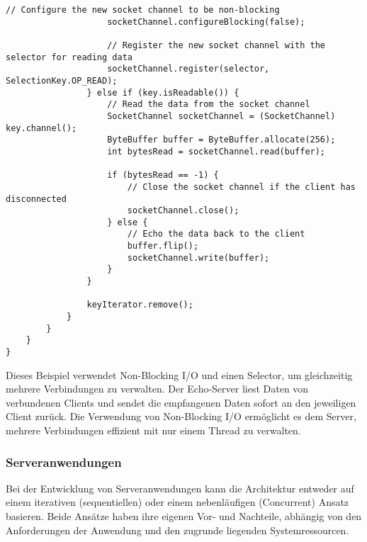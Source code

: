 \begin{lstlisting}[caption={Non-Blocking},captionpos=b,label={lst:nonb}]
                    // Configure the new socket channel to be non-blocking
                    socketChannel.configureBlocking(false);

                    // Register the new socket channel with the selector for reading data
                    socketChannel.register(selector, SelectionKey.OP_READ);
                } else if (key.isReadable()) {
                    // Read the data from the socket channel
                    SocketChannel socketChannel = (SocketChannel) key.channel();
                    ByteBuffer buffer = ByteBuffer.allocate(256);
                    int bytesRead = socketChannel.read(buffer);

                    if (bytesRead == -1) {
                        // Close the socket channel if the client has disconnected
                        socketChannel.close();
                    } else {
                        // Echo the data back to the client
                        buffer.flip();
                        socketChannel.write(buffer);
                    }
                }

                keyIterator.remove();
            }
        }
    }
}
\end{lstlisting}
Dieses Beispiel verwendet Non-Blocking I/O und einen Selector, um gleichzeitig mehrere Verbindungen zu verwalten. Der Echo-Server liest Daten von verbundenen Clients und sendet die empfangenen Daten sofort an den jeweiligen Client zurück. Die Verwendung von Non-Blocking I/O ermöglicht es dem Server, mehrere Verbindungen effizient mit nur einem Thread zu verwalten.

\subsubsection{Serveranwendungen}
Bei der Entwicklung von Serveranwendungen kann die Architektur entweder auf einem iterativen (sequentiellen) oder einem nebenläufigen (Concurrent) Ansatz basieren. Beide Ansätze haben ihre eigenen Vor- und Nachteile, abhängig von den Anforderungen der Anwendung und den zugrunde liegenden Systemressourcen.

